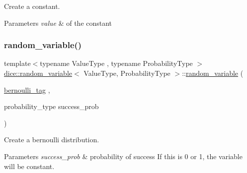 Create a constant. 


\begin{DoxyParams}{Parameters}
{\em value} & of the constant \\
\hline
\end{DoxyParams}
\mbox{\label{classdice_1_1random__variable_a96f7d3bfb204d1b213c1e004132492ee}} 
\subsubsection{\texorpdfstring{random\+\_\+variable()}{random\_variable()}\hspace{0.1cm}{\footnotesize\ttfamily [3/4]}}
{\footnotesize\ttfamily template$<$typename Value\+Type , typename Probability\+Type $>$ \\
\mbox{\hyperlink{classdice_1_1random__variable}{dice\+::random\+\_\+variable}}$<$ Value\+Type, Probability\+Type $>$\+::\mbox{\hyperlink{classdice_1_1random__variable}{random\+\_\+variable}} (\begin{DoxyParamCaption}\item[{\mbox{\hyperlink{classdice_1_1bernoulli__tag}{bernoulli\+\_\+tag}}}]{,  }\item[{probability\+\_\+type}]{success\+\_\+prob }\end{DoxyParamCaption})\hspace{0.3cm}{\ttfamily [inline]}}



Create a bernoulli distribution. 


\begin{DoxyParams}{Parameters}
{\em success\+\_\+prob} & probability of success If this is 0 or 1, the variable will be constant. \\
\hline
\end{DoxyParams}
\mbox{\label{classdice_1_1random__variable_ae60bac2f1326a03ced717a4f0ff12513}} 
